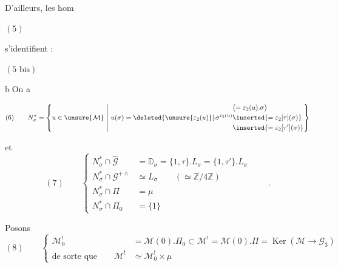 D'ailleurs, les hom

\( (5) \)\quad
{}

s'identifient :

\( (5\text{ bis}) \)\quad
{}

\textcircled{b}\quad On a

\margin{$/$}
\[
(6)\qquad N_\sigma^*=
\left\{u\in\unsure{\mathcal M}\ \middle|\ u(\sigma)=\deleted{\unsure{\varepsilon_2(u)}}\sigma^{\varepsilon_2(u)}
\begin{aligned}
&\bigl(=\varepsilon_2(u).\sigma\bigr)\\
&\inserted{=\varepsilon_2[\tau](\sigma)}\\
&\inserted{=\varepsilon_2[\tau'](\sigma)}
\end{aligned}
\right\}
\]

 et
\[
(7)\qquad
\left\{\begin{aligned}
N_\sigma^*\cap\widehat{\mathcal G}
  &=\mathbb D_\sigma=\{1,\tau\}.L_\sigma=\{1,\tau'\}.L_\sigma\\
N_\sigma^*\cap\mathcal G^{+\wedge}
  &\simeq L_\sigma\qquad(\simeq\mathbb Z/4\mathbb Z)\\
N_\sigma^*\cap\Pi&=\mu\\
N_\sigma^*\cap\Pi_0&=\{1\}
\end{aligned}\right.
\qquad .
\]


Posons
\[
(8)\qquad
\left\{\begin{aligned}
\mathcal M_0^!&=\mathcal M(0).\Pi_0
\subset\mathcal M^!=\mathcal M(0).\Pi
=\operatorname{Ker}(\mathcal M\to\mathcal G_3)\\
\text{de sorte que}\qquad
\mathcal M^!&\simeq\mathcal M_0^!\times\mu
\end{aligned}\right.
\]


